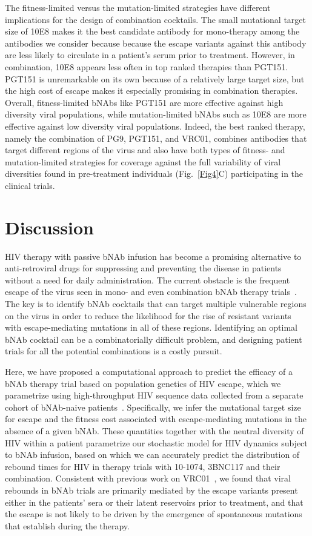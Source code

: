 \documentclass[aps,prx,noshowpacs,twocolumn,nofootinbib]{revtex4-2}
\begin{document}
The fitness-limited versus the mutation-limited  strategies have different implications for the design of combination cocktails. The small mutational target size of 10E8 makes it the best candidate antibody for mono-therapy among the antibodies we consider because because the escape variants against this antibody are less likely to circulate in a patient's serum prior to treatment. However, in combination, 10E8 appears less often in top ranked therapies than PGT151. PGT151 is unremarkable on its own because of a relatively large target size, but the high cost of escape makes it especially promising in combination therapies. Overall, fitness-limited bNAbs like PGT151 are more effective against high diversity viral populations,  while mutation-limited bNAbs such as 10E8 are more effective against low diversity viral populations. Indeed, the best ranked therapy, namely the combination of PG9, PGT151, and VRC01, combines antibodies that target different regions of the virus and also have both types of fitness- and  mutation-limited strategies for coverage against the full variability of viral diversities found in pre-treatment individuals (Fig.~\ref{Fig4}C) participating in the clinical trials.

\section{Discussion}
HIV therapy with passive bNAb infusion has become a promising alternative to anti-retroviral drugs for suppressing and preventing the disease in patients without a need for daily administration. The current obstacle is the frequent escape of the virus seen in  mono- and even combination bNAb therapy trials~\cite{Caskey:2015hm,Bar:2016hg,Caskey:2017el,bar-onSafetyAntiviralActivity2018}. The key is to identify bNAb cocktails that can target multiple vulnerable regions on the virus in order to reduce the likelihood for the rise of resistant variants with escape-mediating mutations  in all of these regions.  Identifying an optimal bNAb cocktail can be a combinatorially difficult problem, and designing patient trials for all the potential combinations is a costly pursuit.

Here, we have proposed a computational approach to predict the efficacy of a bNAb therapy trial based on population genetics of HIV escape, which we parametrize using high-throughput HIV sequence data collected from a separate cohort of bNAb-naive patients~\cite{Zanini:2015gg}. Specifically,  we infer the mutational target size for escape and the fitness cost associated with escape-mediating mutations in the absence of a given bNAb. These quantities together with the neutral diversity of HIV within a patient parametrize our stochastic model for HIV dynamics subject to bNAb infusion, based on which we can accurately predict  the distribution of rebound times for HIV in therapy trials with 10-1074, 3BNC117 and their combination.  Consistent with previous work on VRC01~\cite{Saha:2020fd}, we found that viral rebounds in  bNAb trials are primarily mediated by the escape variants present either in the patients' sera or their latent reservoirs prior to treatment, and that the escape is not {likely to be driven} by the emergence of spontaneous mutations that establish during the therapy.
\end{document}
